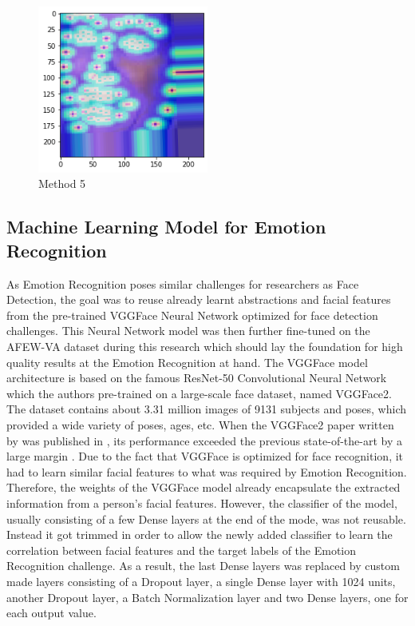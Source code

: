 \begin{center}
\begin{figure}[H]
  \begin{center}
  \includegraphics[angle=0, width=0.5\textwidth]{Figures/method_5.png}
  \caption{Method 5}
  \label{fig:MachineLearningModelMethod_5}
  \end{center}
\end{figure}
\end{center}


\subsection{Machine Learning Model for Emotion Recognition}
As Emotion Recognition poses similar challenges for researchers as Face Detection, the goal was to reuse already learnt abstractions and facial features from the pre-trained VGGFace Neural Network optimized for face detection challenges. This Neural Network model was then further fine-tuned on the AFEW-VA dataset during this research which should lay the foundation for high quality results at the Emotion Recognition at hand.
\newline\newline
The VGGFace model architecture is based on the famous ResNet-50 Convolutional Neural Network which the authors \citet{Cao:2018:VGGFace2} pre-trained on a large-scale face dataset, named VGGFace2. The dataset contains about 3.31 million images of 9131 subjects and poses, which provided a wide variety of poses, ages, etc. When the VGGFace2 paper written by \citet{Cao:2018:VGGFace2} was published in \citeyear{Cao:2018:VGGFace2}, its performance exceeded the previous state-of-the-art by a large margin \citep{Cao:2018:VGGFace2}.
\newline\newline
Due to the fact that VGGFace is optimized for face recognition, it had to learn similar facial features to what was required by Emotion Recognition. Therefore, the weights of the VGGFace model already encapsulate the extracted information from a person's facial features. However, the classifier of the model, usually consisting of a few Dense layers at the end of the mode, was not reusable. Instead it got trimmed in order to allow the newly added classifier to learn the correlation between facial features and the target labels of the Emotion Recognition challenge. As a result, the last Dense layers was replaced by custom made layers consisting of a Dropout layer, a single Dense layer with 1024 units, another Dropout layer, a Batch Normalization layer and two Dense layers, one for each output value.